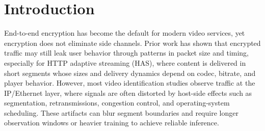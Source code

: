\documentclass[conference]{IEEEtran}
\begin{document}
\maketitle

\begin{abstract}
Gigabit Passive Optical Networks (GPON) are widely used in fiber networks and protect user traffic by encrypting downstream payloads at the GPON Encapsulation Method (GEM) layer. However, encryption does not cover all access-layer metadata.
This paper presents a preliminary analysis showing that the plaintext Payload Length Indicator (PLI) in GEM headers forms a practical privacy side channel that enables video streaming inference. A passive attacker under the same optical splitter can observe downstream traffic and obtain high-rate sequences of GEM payload lengths due to GPON’s broadcast and multiplexed downstream. These length patterns preserve key structural characteristics of HTTP adaptive streaming, enabling inference of the viewed video content from payload length dynamics.
\end{abstract}





%
\IEEEpeerreviewmaketitle



\section{Introduction}
End-to-end encryption has become the default for modern video services, yet encryption does not eliminate side channels. Prior work has shown that encrypted traffic may still leak user behavior through patterns in packet size and timing, especially for HTTP adaptive streaming (HAS), where content is delivered in short segments whose sizes and delivery dynamics depend on codec, bitrate, and player behavior. However, most video identification studies observe traffic at the IP/Ethernet layer, where signals are often distorted by host-side effects such as segmentation, retransmissions, congestion control, and operating-system scheduling. These artifacts can blur segment boundaries and require longer observation windows or heavier training to achieve reliable inference.
\end{document}
